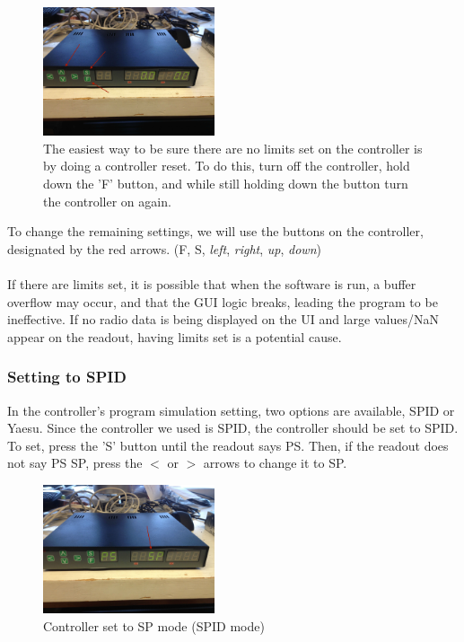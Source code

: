 \documentclass[11pt]{article} %
\begin{document}
\begin{figure}
  \centering
  \caption{The easiest way to be sure there are no limits set on the controller is by doing a controller reset. To do this, turn off the controller, hold down the 'F' button, and while still holding down the button turn the controller on again.  }
  \includegraphics[width=0.45\textwidth]{controller/01.jpeg}
\end{figure}



To change the remaining settings, we will use the buttons on the controller, designated by the red arrows. (F, S, \emph{left}, \emph{right}, \emph{up}, \emph{down})
\\ \\
If there are limits set, it is possible that when the software is run, a buffer overflow may occur, and that the GUI logic breaks, leading the program to be ineffective. If no radio data is being displayed on the UI and large values/NaN appear on the readout, having limits set is a potential cause.

\subsubsection{Setting to SPID}

In the controller's program simulation setting, two options are available, SPID or Yaesu. Since the controller we used is SPID, the controller should be set to SPID. To set, press the 'S' button until the readout says PS. Then, if the readout does not say PS SP, press the $<$ or $>$ arrows to change it to SP. 

\begin{figure}
  \centering
  \caption{Controller set to SP mode (SPID mode) }
  \includegraphics[width=0.45\textwidth]{controller/02.jpeg}
\end{figure}
\end{document}
